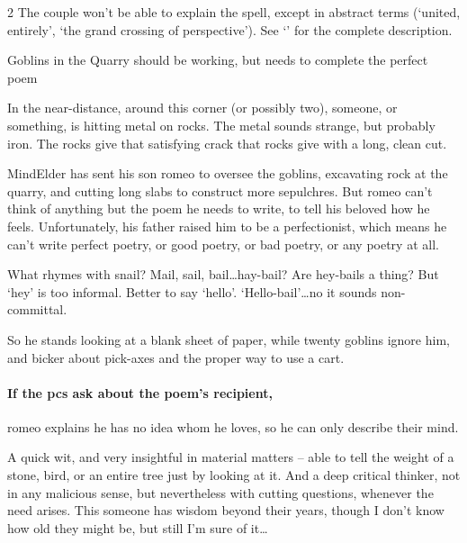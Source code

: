 \begin{multicols}{2}
The couple won't be able to explain the \gls{spell}, except in abstract terms (`united, entirely', `the grand crossing of perspective').
See `'  for the complete description.

{Goblins in the Quarry}%
{ should be working, but needs to complete the perfect poem}%
\label{goblinQuarry}

\begin{boxtext}
  In the near-distance, around this corner (or possibly two), someone, or something, is hitting metal on rocks.
  The metal sounds strange, but probably iron.
  The rocks give that satisfying crack that rocks give with a long, clean cut.
\end{boxtext}

\Gls{MindElder} has sent his son \gls{romeo} to oversee the goblins, excavating rock at the quarry, and cutting long slabs to construct more sepulchres.
But \gls{romeo} can't think of anything but the poem he needs to write, to tell his beloved how he feels.
Unfortunately, his father raised him to be a perfectionist, which means he can't write perfect poetry, or good poetry, or bad poetry, or any poetry at all.

\begin{speechtext}
  What rhymes with snail?
  Mail, sail, bail\ldots hay-bail?
  Are hey-bails a thing?
  But `hey' is too informal.
  Better to say `hello'.
  `Hello-bail'\ldots no it sounds non-committal.
\end{speechtext}

So he stands looking at a blank sheet of paper, while twenty goblins ignore him, and bicker about pick-axes and the proper way to use a cart.

\paragraph{If the \glspl{pc} ask about the poem's recipient,}
\gls{romeo} explains he has no idea whom he loves, so he can only describe their mind.

\begin{speechtext}
  A quick wit, and very insightful in material matters -- able to tell the weight of a stone, bird, or an entire tree just by looking at it.
  And a deep critical thinker, not in any malicious sense, but nevertheless with cutting questions, whenever the need arises.
  This someone has wisdom beyond their years, though I don't know how old they might be, but still I'm sure of it\ldots


\end{speechtext}
\end{multicols}
